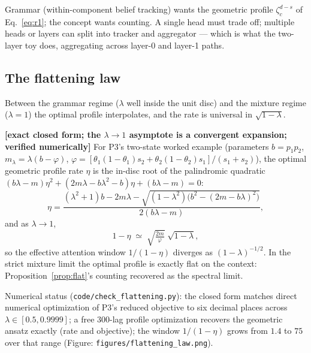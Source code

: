 \documentclass{article}
\begin{document}
Grammar (within-component belief tracking) wants the geometric profile $\zeta_c^{d-s}$ of Eq.~\eqref{eq:r1}; the concept wants counting. A single head must trade off; multiple heads or layers can split into tracker and aggregator --- which is what the two-layer toy does, aggregating across layer-0 and layer-1 paths.

\subsection{The flattening law}\label{sec:flattening}

Between the grammar regime ($\lambda$ well inside the unit disc) and the mixture regime ($\lambda = 1$) the optimal profile interpolates, and the rate is universal in $\sqrt{1 - \lambda}$.

\begin{prop}\label{prop:flattening}
\textbf{[exact closed form; the $\lambda \to 1$ asymptote is a convergent expansion; verified numerically]} For P3's two-state worked example (parameters $b = p_1 p_2$, $m_\lambda = \lambda(b - \varphi)$, $\varphi = [\theta_1(1-\theta_1)s_2 + \theta_2(1-\theta_2)s_1]/(s_1 + s_2)$), the optimal geometric profile rate $\eta$ is the in-disc root of the palindromic quadratic $(b\lambda - m)\eta^2 + (2m\lambda - b\lambda^2 - b)\eta + (b\lambda - m) = 0$:
\begin{equation}
    \eta = \frac{(\lambda^2 + 1)b - 2m\lambda - \sqrt{(1 - \lambda^2)\big(b^2 - (2m - b\lambda)^2\big)}}{2(b\lambda - m)} ,
\end{equation}
and as $\lambda \to 1$,
\begin{equation}\label{eq:sqrtlaw}
    1 - \eta \;\simeq\; \sqrt{\tfrac{2m}{\varphi}}\;\sqrt{1 - \lambda} ,
\end{equation}
so the effective attention window $1/(1 - \eta)$ diverges as $(1 - \lambda)^{-1/2}$. In the strict mixture limit the optimal profile is exactly flat on the context: Proposition~\ref{prop:flat}'s counting recovered as the spectral limit.
\end{prop}

Numerical status (\texttt{code/check\_flattening.py}): the closed form matches direct numerical optimization of P3's reduced objective to six decimal places across $\lambda \in [0.5, 0.9999]$; a free $300$-lag profile optimization recovers the geometric ansatz exactly (rate and objective); the window $1/(1-\eta)$ grows from $1.4$ to $75$ over that range (Figure: \texttt{figures/flattening\_law.png}).
\end{document}
